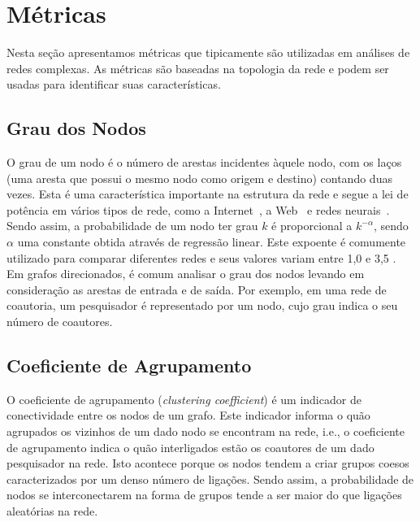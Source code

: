 \section{Métricas}
Nesta seção apresentamos métricas que tipicamente são utilizadas em análises de redes complexas. As métricas são 
baseadas na topologia da rede e podem ser usadas para identificar suas características.

\subsection{Grau dos Nodos}

O grau de um nodo é o número de arestas incidentes àquele nodo, com os laços (uma aresta que possui o mesmo nodo 
como origem e destino) contando duas vezes. Esta é uma característica importante na estrutura da rede e segue a lei de 
potência em vários tipos de rede, como a Internet~\citep{Faloutsos1999}, a Web~\citep{Barabasi1999} e redes 
neurais~\citep{Braitenberg1998}. Sendo assim, a probabilidade de um nodo ter grau $k$ é proporcional a $k^{-\alpha}$, 
sendo $\alpha$ uma constante obtida através de regressão linear. Este expoente é comumente utilizado para comparar diferentes 
redes e seus valores variam entre 1,0 e 3,5 \citep{Ebel2002}. Em grafos direcionados, é comum analisar o grau dos nodos 
levando em consideração as arestas de entrada e de saída. Por exemplo, em uma rede de coautoria, um pesquisador é 
representado por um nodo, cujo grau indica o seu número de coautores.


\subsection{Coeficiente de Agrupamento}

O coeficiente de agrupamento (\textit{clustering coefficient}) é um indicador de conectividade entre os nodos de um 
grafo. Este indicador informa o quão agrupados os vizinhos de um dado nodo se encontram na rede, i.e., o coeficiente de 
agrupamento indica o quão interligados estão os coautores de um dado pesquisador na rede. Isto acontece porque os 
nodos tendem a criar grupos coesos caracterizados por um denso número de ligações. Sendo assim, a probabilidade
de nodos se interconectarem na forma de grupos tende a ser maior do que ligações aleatórias na rede.


